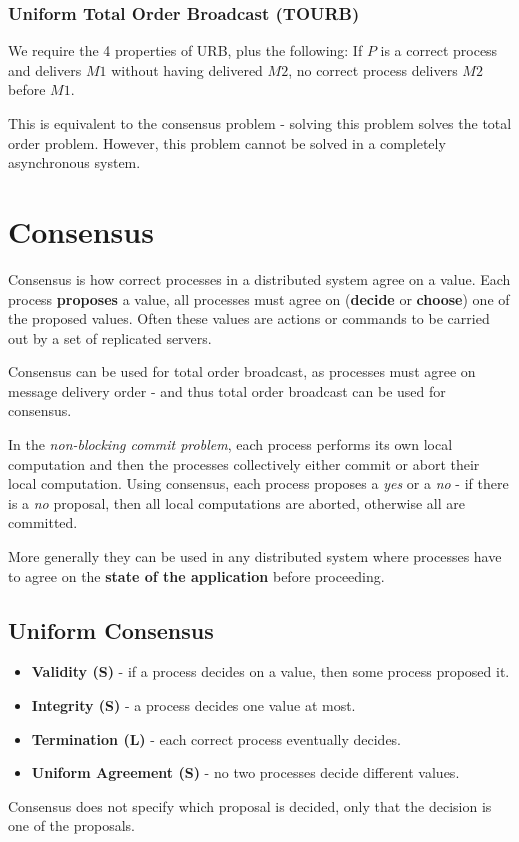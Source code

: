 \documentclass[11pt]{article}
\begin{document}
\subsubsection{Uniform Total Order Broadcast (TOURB)}
We require the 4 properties of URB, plus the following:
If $P$ is a correct process and delivers $M1$ without having delivered $M2$, no correct process delivers $M2$ before $M1$.

This is equivalent to the consensus problem - solving this problem solves the total order problem.
However, this problem cannot be solved in a completely asynchronous system.

\section{Consensus}
Consensus is how correct processes in a distributed system agree on a value.
Each process \textbf{proposes} a value, all processes must agree on (\textbf{decide} or \textbf{choose}) one of the proposed values.
Often these values are actions or commands to be carried out by a set of replicated servers.

Consensus can be used for total order broadcast, as processes must agree on message delivery order - and thus total order broadcast can be used for consensus.

In the \textit{non-blocking commit problem}, each process performs its own local computation and then the processes collectively either commit or abort their local computation.
Using consensus, each process proposes a \textit{yes} or a \textit{no} - if there is a \textit{no} proposal, then all local computations are aborted, otherwise all are committed.

More generally they can be used in any distributed system where processes have to agree on the \textbf{state of the application} before proceeding.

\subsection{Uniform Consensus}
\begin{itemize}
  \item \textbf{Validity (S)} - if a process decides on a value, then some process proposed it.
  \item \textbf{Integrity (S)} - a process decides one value at most.
  \item \textbf{Termination (L)} - each correct process eventually decides.
  \item \textbf{Uniform Agreement (S)} - no two processes decide different values.
\end{itemize}
Consensus does not specify which proposal is decided, only that the decision is one of the proposals.
\end{document}
